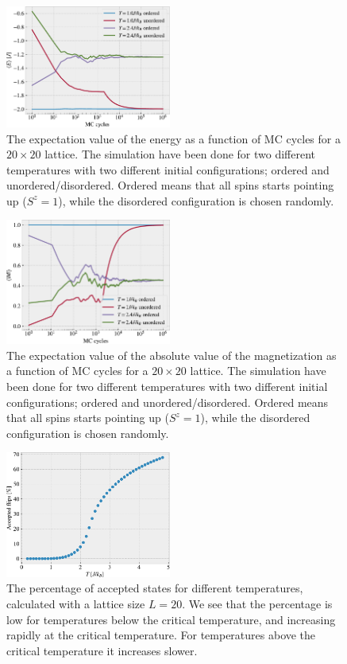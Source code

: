\documentclass[%
 reprint,
nofootinbib,
aps,
]{revtex4-1}
\begin{document}
\begin{figure}
\includegraphics[width=0.485\textwidth]{../figures/problem_c_E.pdf}
\caption{The expectation value of the energy as a function of MC cycles for a $20 \times 20$ lattice. The simulation have been done for two different temperatures with two different initial configurations; ordered and unordered/disordered. Ordered means that all spins starts pointing up ($S^z = 1$), while the disordered configuration is chosen randomly.}
\label{fig:L20E}
\end{figure}



\begin{figure}
\includegraphics[width=0.485\textwidth]{../figures/problem_c_M.pdf}
\caption{The expectation value of the absolute value of the magnetization as a function of MC cycles for a $20 \times 20$ lattice. The simulation have been done for two different temperatures with two different initial configurations; ordered and unordered/disordered. Ordered means that all spins starts pointing up ($S^z = 1$), while the disordered configuration is chosen randomly.}
\label{fig:L20M}
\end{figure}

\begin{figure}
\includegraphics[width=0.485\textwidth]{../figures/problem_c_2.pdf}
\caption{The percentage of accepted states for different temperatures, calculated with a lattice size $L = 20$. We see that the percentage is low for temperatures below the critical temperature, and increasing rapidly at the critical temperature. For temperatures above the critical temperature it increases slower.}
\label{fig:L20accepting}
\end{figure}
\end{document}
